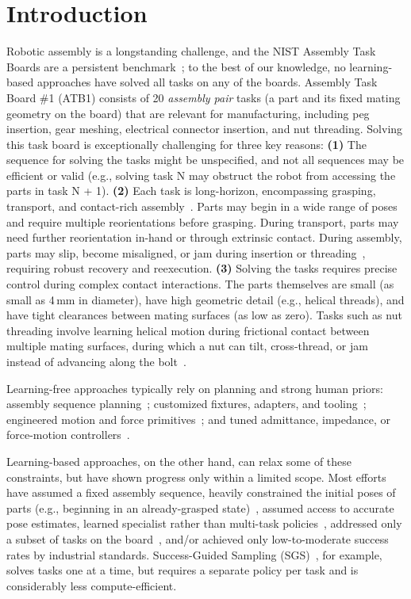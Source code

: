 \section{Introduction}
\label{sec:introduction}
Robotic assembly is a longstanding challenge, and the NIST Assembly Task Boards are a persistent benchmark~\cite{kimble2020benchmarking}; to the best of our knowledge, no learning-based approaches have solved all tasks on any of the boards. Assembly Task Board \#1 (ATB1) consists of 20 \textit{assembly pair} tasks (a part and its fixed mating geometry on the board) that are relevant for manufacturing, including peg insertion, gear meshing, electrical connector insertion, and nut threading.
Solving this task board is exceptionally challenging for three key reasons:
\textbf{(1)} The sequence for solving the tasks might be unspecified, and not all sequences may be efficient or valid (e.g., solving task N may obstruct the robot from accessing the parts in task N + 1).
\textbf{(2)} Each task is long-horizon, encompassing grasping, transport, and
contact-rich assembly~\cite{narang2022factory}.
Parts may begin in a wide range of poses and require multiple
reorientations before grasping.
During transport, parts may need further reorientation in-hand or
through extrinsic contact.
During assembly, parts may slip, become misaligned, or
jam during insertion or threading~\cite{narang2022factory}, requiring
robust recovery and reexecution.
\textbf{(3)} Solving the tasks requires precise control during complex contact interactions. The parts themselves are small (as small as 4\,mm in diameter), have high geometric detail (e.g., helical threads), and have tight clearances between mating surfaces (as low as zero).
Tasks such as nut threading involve learning helical motion during frictional contact between multiple mating surfaces, during which a nut can tilt, cross-thread, or jam instead of advancing along the bolt~\cite{narang2022factory}.

Learning-free approaches typically rely on planning and strong human priors:
assembly sequence planning~\cite{lozano1993assembly}; customized fixtures,
adapters, and tooling~\cite{kimble2020benchmarking,lian2021benchmarking}; engineered
motion and force primitives~\cite{morgan2023contact}; and tuned admittance,
impedance, or force-motion controllers~\cite{lian2021benchmarking,morgan2023contact}.

Learning-based approaches, on the other hand, can relax some of these constraints, but have shown progress only within a limited scope.
Most efforts have assumed a fixed assembly sequence, heavily constrained the initial poses of parts (e.g., beginning in an already-grasped state)~\cite{luo2021robust}, assumed access to accurate pose estimates, learned specialist rather than multi-task policies~\cite{narang2022factory}, addressed only a subset of tasks on the board~\cite{luo2021robust}, and/or achieved only low-to-moderate success rates by industrial standards.
Success-Guided Sampling (SGS)~\cite{zhang2026balanceddiet}, for example, solves tasks one at a time, but requires a separate policy per task and is considerably less compute-efficient.

